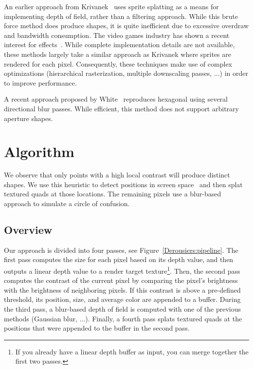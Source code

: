An earlier approach from Krivanek~\cite{Krivanek03} uses sprite splatting as a means for implementing depth of field, rather than a filtering approach. While this brute force method does produce \bokeh shapes, it is quite inefficient due to excessive overdraw and bandwidth consumption. The video games industry has shown a recent interest for \bokeh effects~\cite{Sousa11,Futurmark11,Mittring11}. While complete implementation details are not available, these methods largely take a similar approach as Krivanek where sprites are rendered for each pixel. Consequently, these techniques make use of complex optimizations (hierarchical rasterization, multiple downscaling passes, ...) in order to improve performance. 

A recent approach proposed by White~\cite{White11} reproduces hexagonal \bokeh using several directional blur passes. While efficient, this method does not support arbitrary aperture shapes.

\section{Algorithm}
We observe that only points with a high local contrast will produce distinct \bokeh shapes. We use this heuristic to detect \bokeh positions in screen space~\cite{Pettineo11} and then splat textured quads at those locations. The remaining pixels use a blur-based approach to simulate a circle of confusion.

\subsection{Overview}
Our approach is divided into four passes, see Figure~\ref{Derousiers:pipeline}. The first pass computes the \coc size for each pixel based on its depth value, and then outputs a linear depth value to a render target texture\footnote{If you already have a linear depth buffer as input, you can merge together the first two passes.}. Then, the second pass computes the contrast of the current pixel by comparing the pixel's brightness with the brightness of neighboring pixels. If this contrast is above a pre-defined threshold, its position, \coc size, and average color are appended to a buffer. During the third pass, a blur-based depth of field is computed with one of the previous methods (Gaussian blur, ...). Finally, a fourth pass splats textured quads at the \bokeh positions that were appended to the buffer in the second pass.

